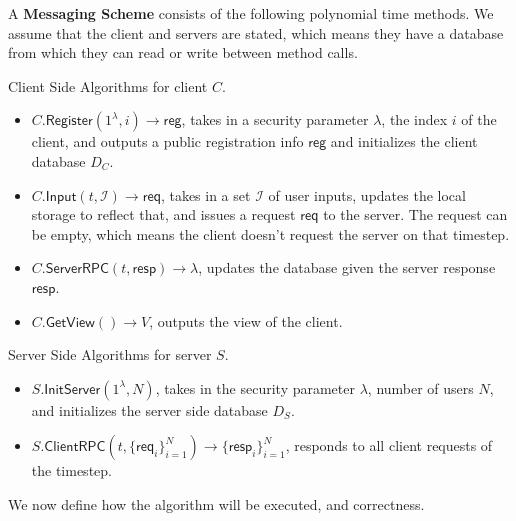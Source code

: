 \documentclass[sigconf, nonacm, balance=false, natbib=false, screen]{acmart}
\newcommand{\reg}{\mathsf{reg}}
\newcommand{\req}{\mathsf{req}}
\newcommand{\resp}{\mathsf{resp}}
\newcommand{\cI}{\mathcal{I}}
\begin{document}
\begin{definition}
A \textbf{Messaging Scheme} consists of the following polynomial time methods. We assume that the client and servers are stated, which means they have a database from which they can read or write between method calls.

Client Side Algorithms for client $C$.
\begin{itemize}
    \item $C.\mathsf{Register}(1^{\lambda}, i) \to \reg$, takes in a security parameter $\lambda$, the index $i$ of the client, and outputs a public registration info $\reg$ and initializes the client database $D_C$.
    
    \item $C.\mathsf{Input}(t, \cI) \to \req$, takes in a set $\cI$ of user inputs, updates the local storage to reflect that, and issues a request $\req$ to the server. The request can be empty, which means the client doesn't request the server on that timestep.
    
    \item $C.\mathsf{ServerRPC}(t, \resp)\to \lambda$, updates the database given the server response $\resp$.
    
    \item $C.\mathsf{GetView}() \to V$, outputs the view of the client.
\end{itemize}

Server Side Algorithms for server $S$.

\begin{itemize}
    \item $S.\mathsf{InitServer}(1^{\lambda}, N)$, takes in the security parameter $\lambda$, number of users $N$, and initializes the server side database $D_S$.
    \item $S.\mathsf{ClientRPC}(t, \{\req_i\}_{i = 1}^N) \to \{\resp_i\}_{i = 1}^N$, responds to all client requests of the timestep.
\end{itemize}
\end{definition}
We now define how the algorithm will be executed, and correctness.
\end{document}
